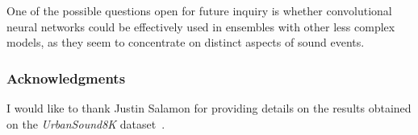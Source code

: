 \documentclass{article}
\begin{document}
One of the possible questions open for future inquiry is whether convolutional neural networks could be effectively used in ensembles with other less complex models, as they seem to concentrate on distinct aspects of sound events.

\vspace{-8pt}

\subsubsection*{Acknowledgments}

I would like to thank Justin Salamon for providing details on the results obtained on the \textit{UrbanSound8K} dataset~\cite{salamon2015unsupervised}.


\begin{spacing}{0.94}




\end{spacing}
\end{document}

